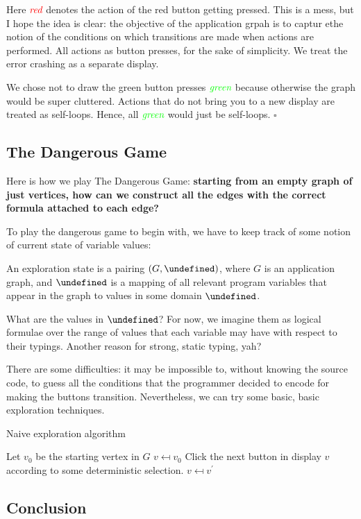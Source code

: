 \documentclass[12pt]{article}
\let\state\undefined
\newcommand{\state}{\ensuremath{\sigma}}
\let\domval\undefined
\newcommand{\domval}{\ensuremath{\mathcal{A}}}
\begin{document}
\begin{example}[Simple UI]
\begin{center}
\end{center}

Here ${\color{red} \textit{red}}$ denotes the action of the red button getting pressed.
This is a mess, but I hope the idea is clear: the objective of the application
grpah is to captur ethe notion of the conditions on which transitions are
made when actions are performed.
All actions as button presses, for the sake of simplicity.
We treat the error crashing as a separate display.

We chose not to draw the green button presses ${\color{green} \textit{green}}$ because otherwise
the graph would be super cluttered.
Actions that do not bring you to a new display are treated as self-loops.
Hence, all ${\color{green} \textit{green}}$ would just be self-loops.
$\square$
\end{example}

\subsection{The Dangerous Game}

Here is how we play The Dangerous Game:
\textbf{starting from an empty graph of just vertices,
how can we construct all the edges with the correct formula
attached to each edge?}

To play the dangerous game to begin with, we have to keep
track of some notion of current state of variable values:
\begin{definition}
An exploration state is a pairing $\parens{G, \state}$,
where $G$ is an application graph, and $\state$ is a mapping of all relevant
program variables that appear in the graph to values in some
domain $\domval$.
\end{definition}

What are the values in $\domval$?
For now, we imagine them as logical formulae over the range of values that
each variable may have with respect to their typings.
Another reason for strong, static typing, yah?

There are some difficulties:
it may be impossible to, without knowing
the source code, to guess all the conditions that the programmer decided
to encode for making the buttons transition.
Nevertheless, we can try some basic, basic exploration techniques.


\begin{algorithm}[H]
\caption{Naive exploration algorithm}
\begin{algorithmic}[1]
  \State Let $v_0$ be the starting vertex in $G$
  \State $v \mapsfrom v_0$
    \State Click the next button in display $v$ according to some
           deterministic selection.
      \State 
      \State $v \mapsfrom v^\prime$
    \EndIf
  \EndWhile
\EndProcedure
\end{algorithmic}
\end{algorithm}



\subsection{Conclusion}


\printbibliography
\end{document}
